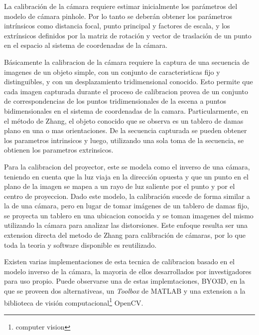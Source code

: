 La calibración de la cámara requiere estimar inicialmente los parámetros del modelo de cámara pinhole. Por lo tanto se deberán obtener los parámetros intrínsicos como distancia focal, punto principal y factores de escala, y los extrínsicos definidos por la matriz de rotación y vector de traslación de un punto en el espacio al sistema de coordenadas de la cámara. 

Básicamente la calibracion de la cámara requiere la captura de una secuencia de imagenes de un objeto simple, con un conjunto de caracteristicas fijo y distinguibles, y con un desplazamiento tridimensional conocido. Esto permite que cada imagen capturada durante el proceso de calibracion provea de un conjunto de correspondencias de los puntos tridimensionales de la escena a puntos bidimensionales en el sistema de coordenadas de la camara. Particularmente, en el método de Zhang, el objeto conocido que se observa es un tablero de damas plano en una o mas orientaciones. De la secuencia capturada se pueden obtener los parametros intrinsicos y luego, utilizando una sola toma de la secuencia,  se obtienen los parametros extrinsicos.

Para la calibracion del proyector, este se modela como el inverso de una cámara, teniendo en cuenta que la luz viaja en la dirección opuesta y que un punto en el plano de la imagen se mapea a un rayo de luz saliente por el punto y por el centro de proyeccion. Dado este modelo, la calibración sucede de forma similar a la de una cámara, pero en lugar de tomar imágenes de un tablero de damas fijo, se proyecta un tablero en una ubicacion conocida y se toman imagenes del mismo utilizando la cámara para analizar las distorsiones. Este enfoque resulta ser una extension directa del metodo de Zhang para calibración de cámaras, por lo que toda la teoria y software disponible es reutilizado.

Existen varias implementaciones de esta tecnica de calibracion basado en el modelo inverso de la cámara, la mayoria de ellos desarrollados por investigadores para uso propio. Puede observarse una de estas implemtaciones, BYO3D\cite{BYO3D}, en la que se proveen dos alternativeas, un \emph{Toolbox} de MATLAB\cite{MATLAB} y una extension a la biblioteca de visión computacional\footnote{computer vision} OpenCV\cite{OpenCV}.

